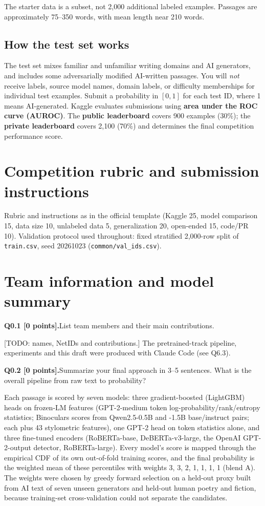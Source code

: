 \documentclass[11pt,letterpaper]{article}
\newcommand{\question}[2]{\needspace{4\baselineskip}\par\addvspace{0.45em}\noindent\textbf{#1}\quad #2\par\nobreak\vspace{0.1em}}
\newcommand{\smallnote}[1]{{\small\color{muted}#1}}
\begin{document}
\smallnote{The starter data is a subset, not 2,000 additional labeled examples. Passages are approximately 75--350 words, with mean length near 210 words.}

\subsection*{How the test set works}
The test set mixes familiar and unfamiliar writing domains and AI generators, and includes some adversarially modified AI-written passages. You will \emph{not} receive labels, source model names, domain labels, or difficulty memberships for individual test examples. Submit a probability in $[0,1]$ for each test ID, where 1 means AI-generated. Kaggle evaluates submissions using \textbf{area under the ROC curve (AUROC)}. The \textbf{public leaderboard} covers 900 examples (30\%); the \textbf{private leaderboard} covers 2,100 (70\%) and determines the final competition performance score.

\vfill
\newpage
\section{Competition rubric and submission instructions}
\smallnote{Rubric and instructions as in the official template (Kaggle 25, model comparison 15, data size 10, unlabeled data 5, generalization 20, open-ended 15, code/PR 10). Validation protocol used throughout: fixed stratified 2,000-row split of \texttt{train.csv}, seed 20261023 (\texttt{common/val\_ids.csv}).}

\section{Team information and model summary}
\question{Q0.1 [0 points].}{List team members and their main contributions.}
[TODO: names, NetIDs and contributions.] The pretrained-track pipeline, experiments and this draft were produced with Claude Code (see Q6.3).

\question{Q0.2 [0 points].}{Summarize your final approach in 3--5 sentences. What is the overall pipeline from raw text to probability?}
Each passage is scored by seven models: three gradient-boosted (LightGBM) heads on frozen-LM features (GPT-2-medium token log-probability/rank/entropy statistics; Binoculars scores from Qwen2.5-0.5B and -1.5B base/instruct pairs; each plus 43 stylometric features), one GPT-2 head on token statistics alone, and three fine-tuned encoders (RoBERTa-base, DeBERTa-v3-large, the OpenAI GPT-2-output detector, RoBERTa-large). Every model's score is mapped through the empirical CDF of its own out-of-fold training scores, and the final probability is the weighted mean of these percentiles with weights 3, 3, 2, 1, 1, 1, 1 (blend A). The weights were chosen by greedy forward selection on a held-out proxy built from AI text of seven unseen generators and held-out human poetry and fiction, because training-set cross-validation could not separate the candidates.
\end{document}

